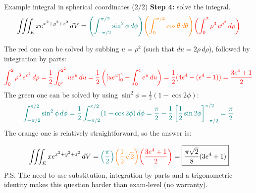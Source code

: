 \begin{frame}{Example integral in spherical coordinates (2/2)}
    \footnotesize
    \textbf{Step 4:} solve the integral.
    \[
        \iiint_E xe^{x^2+y^2+z^2}\,dV =\textcolor{teal}{\left(\int_{-\pi/2}^{\pi/2}\sin^2\phi\,d\phi\right)}\textcolor{orange}{\left(\int_0^{\pi/4}\cos\theta\,d\theta\right)}\textcolor{red}{\left(\int_0^2\rho^3\,e^{\rho^2}\,d\rho\right)}
    \]

    \pause The red one can be solved by subbing $u=\rho^2$ (such that $du=2\rho \,d\rho$), followed by integration by parts:
    \[\textcolor{red}{\int_0^2\rho^3\,e^{\rho^2}\,d\rho=\frac{1}{2}\int_{0^2}^{2^2}ue^u\,du=\frac{1}{2}\left(\left[ue^u\right]_0^4-\int_0^4e^u\,du\right)=\frac{1}{2}(4e^4-(e^4-1))=\frac{3e^4+1}{2}}\]
    \pause The green one can be solved by using $\sin^2\phi=\frac{1}{2}\left(1-\cos2\phi\right)$:
    \[\textcolor{teal}{\int_{-\pi/2}^{\pi/2}\sin^2\phi\,d\phi=\frac{1}{2}\int_{-\pi/2}^{\pi/2}(1-\cos2\phi)\,d\phi=\frac{\pi}{2}-\frac{1}{2}\left[\frac{1}{2}\sin2\phi\right]_{-\pi/2}^{\pi/2}=\frac{\pi}{2}}\]
    \pause The orange one is relatively straightforward, so the answer is:

    \[
        \iiint_E xe^{x^2+y^2+z^2}\,dV =\textcolor{teal}{\left(\frac{\pi}{2}\right)}\textcolor{orange}{\left(\frac{1}{2}\sqrt{2}\right)}\textcolor{red}{\left(\frac{3e^4+1}{2}\right)}=\boxed{\frac{\pi\sqrt2}{8}(3e^4+1)}
    \]
\scriptsize    P.S. The need to use substitution, integration by parts and a trigonometric identity makes this question harder than exam-level (no warranty). 
\end{frame}

